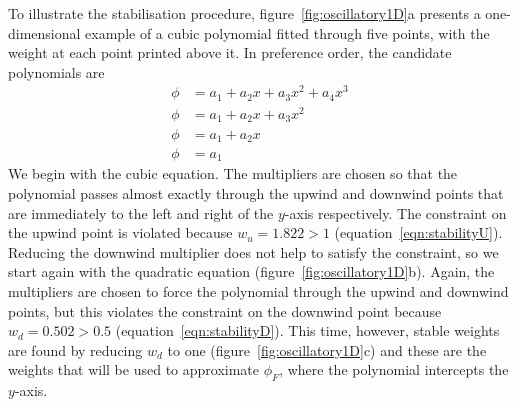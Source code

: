 To illustrate the stabilisation procedure, figure~\ref{fig:oscillatory1D}a presents a one-dimensional example of a cubic polynomial fitted through five points, with the weight at each point printed above it.
In preference order, the candidate polynomials are
\begin{align}
	\phi &= a_1 + a_2 x + a_3 x^2 + a_4 x^3 \\
	\phi &= a_1 + a_2 x + a_3 x^2 \\
	\phi &= a_1 + a_2 x \\
	\phi &= a_1
\end{align}
We begin with the cubic equation.  The multipliers are chosen so that the polynomial passes almost exactly through the upwind and downwind points that are immediately to the left and right of the $y$-axis respectively.
The constraint on the upwind point is violated because $w_u = 1.822 > 1$ (equation~\ref{eqn:stabilityU}).  Reducing the downwind multiplier does not help to satisfy the constraint, so we start again with the quadratic equation (figure~\ref{fig:oscillatory1D}b).
Again, the multipliers are chosen to force the polynomial through the upwind and downwind points, but this violates the constraint on the downwind point because $w_d = 0.502 > 0.5$ (equation~\ref{eqn:stabilityD}).  This time, however, stable weights are found by reducing $w_d$ to one (figure~\ref{fig:oscillatory1D}c) and these are the weights that will be used to approximate $\phi_F$, where the polynomial intercepts the $y$-axis.
